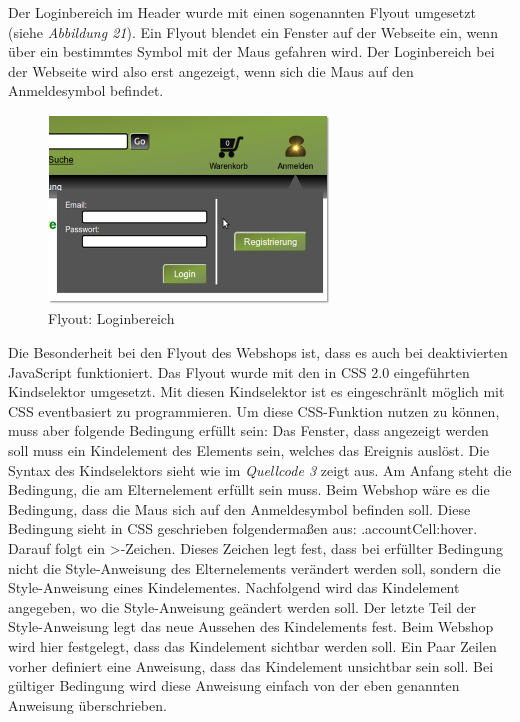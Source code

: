 Der Loginbereich im Header wurde mit einen sogenannten \glqq Flyout\grqq{} umgesetzt (siehe \textit{Abbildung 21}). Ein Flyout blendet ein Fenster auf der Webseite ein, wenn über ein bestimmtes Symbol mit der Maus gefahren wird. Der Loginbereich bei der Webseite wird also erst angezeigt, wenn sich die Maus auf den Anmeldesymbol befindet. 

\begin{figure}[H]
	\begin{center}
			\includegraphics[width=75mm]{Bilder/Abbildung14_Loginbereich.png}
	\end{center}
	\caption{Flyout: Loginbereich}
\end{figure}

Die Besonderheit bei den Flyout des Webshops ist, dass es auch bei deaktivierten JavaScript funktioniert.  Das Flyout wurde mit den in CSS 2.0 eingeführten \glqq Kindselektor\grqq{} umgesetzt. Mit diesen \glqq Kindselektor\grqq{} ist es eingeschränlt möglich mit CSS eventbasiert zu programmieren. Um diese CSS-Funktion nutzen zu können, muss aber folgende Bedingung erfüllt sein: Das Fenster, dass angezeigt werden soll muss ein Kindelement des Elements sein, welches das Ereignis auslöst. Die Syntax des \glqq Kindselektors\grqq{} sieht wie im \textit{Quellcode 3} zeigt aus. Am Anfang steht die Bedingung, die am Elternelement erfüllt sein muss. Beim Webshop wäre es die Bedingung, dass die Maus sich auf den Anmeldesymbol befinden soll. Diese Bedingung sieht in CSS geschrieben folgendermaßen aus: \glqq .accountCell:hover\grqq{}. Darauf folgt ein \glqq >\grqq{}-Zeichen. Dieses Zeichen legt fest, dass bei erfüllter Bedingung nicht die Style-Anweisung des Elternelements verändert werden soll, sondern die Style-Anweisung eines Kindelementes. Nachfolgend wird das Kindelement angegeben, wo die Style-Anweisung geändert werden soll. Der letzte Teil der Style-Anweisung legt das neue Aussehen des Kindelements fest. Beim Webshop wird hier festgelegt, dass das Kindelement sichtbar werden soll. Ein Paar Zeilen vorher definiert eine Anweisung, dass das Kindelement unsichtbar sein soll. Bei gültiger Bedingung wird diese Anweisung einfach von der eben genannten Anweisung überschrieben.

